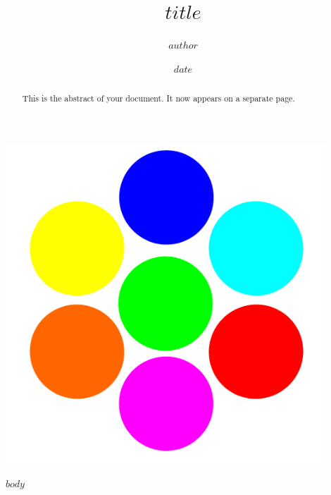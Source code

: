\documentclass{article}
\begin{document}
\begin{titlepage}
 \begin{center}

    \includegraphics[width=0.9\textwidth]{./data/logo_evo.png}

    \title{$title$}
    \author{$author$}
    \date{$date$}

      \end{center}
      \vspace*{\fill}
\end{titlepage}
 \maketitle
\newpage
\begin{abstract}
    This is the abstract of your document. It now appears on a separate page.
\end{abstract}

\newpage
{
\hypersetup{linkcolor=white}
\tableofcontents
}

\newpage
$body$
\end{document}
